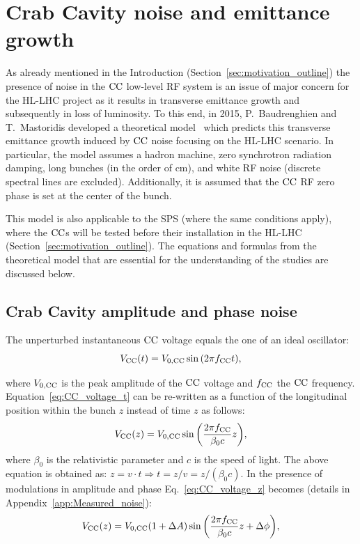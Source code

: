 

\section{Crab Cavity noise and emittance growth}\label{sec:CC_noise_intro}
As already mentioned in the Introduction (Section~\ref{sec:motivation_outline}) the presence of noise in the ${\mathrm{CC}}$ low-level RF system is an issue of major concern for the HL-LHC project as it results in transverse emittance growth and subsequently in loss of luminosity. To this end, in 2015, P.~Baudrenghien and T.~Mastoridis developed a theoretical model~\cite{PhysRevSTAB.18.101001} which predicts this transverse emittance growth induced by ${\mathrm{CC}}$ noise focusing on the HL-LHC scenario. In particular, the model assumes a hadron machine, zero synchrotron radiation damping, long bunches (in the order of cm), and white RF noise (discrete spectral lines are excluded). Additionally, it is assumed that the ${\mathrm{CC}}$ RF zero phase is set at the center of the bunch.

This  model is also applicable to the SPS (where the same conditions apply), where the ${\mathrm{CC}}$s will be tested before their installation in the HL-LHC (Section~\ref{sec:motivation_outline}). The equations and formulas from the theoretical model that are essential for the understanding of the studies are discussed below.


\subsection{Crab Cavity amplitude and phase noise}\label{subsec:AN_PN}
The unperturbed instantaneous ${\mathrm{CC}}$ voltage equals the one of an ideal oscillator:
\begin{equation}\label{eq:CC_voltage_t}
    V_\mathrm{CC}(t) = {V_\mathrm{0, CC}} \sin{\left ( 2 \pi {f_\mathrm{CC}}t \right )},
\end{equation}

where ${V_\mathrm{0, CC}}$ is the peak amplitude of the ${\mathrm{CC}}$ voltage and ${f_\mathrm{CC}}$ the ${\mathrm{CC}}$ frequency. Equation~\eqref{eq:CC_voltage_t} can be re-written as a function of the longitudinal position within the bunch $z$ instead of time $z$ as follows:
\begin{equation}\label{eq:CC_voltage_z}
    V_\mathrm{CC}(z) = {V_\mathrm{0, CC}} \sin{\left ( \frac{2\pi {f_\mathrm{CC}}}{\beta_0 c}z \right )},
\end{equation}
where $\beta_0$ is the relativistic parameter and $c$ is the speed of light. The above equation is obtained as: $z=v \cdot t \Rightarrow t=z/v=z/(\beta_0 c)$.
In the presence of modulations in amplitude and phase Eq.~\eqref{eq:CC_voltage_z} becomes (details in Appendix~\ref{app:Measured_noise}):
\begin{equation}\label{eq:CC_voltage_z}
    V_\mathrm{CC}(z) = {V_\mathrm{0, CC}} (1+\Delta A) \sin{\left ( \frac{2\pi {f_\mathrm{CC}}}{\beta_0 c}z + \Delta \phi \right )},
\end{equation}

